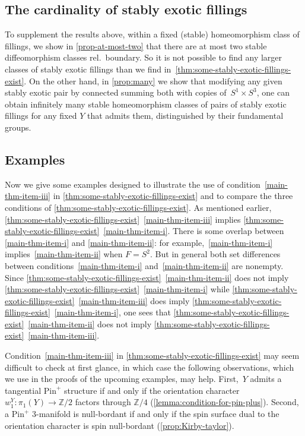 \documentclass[a4paper, reqno]{amsart}
\theoremstyle{definition}
\theoremstyle{remark}
\newcommand{\Z}{\mathbb{Z}}
\newcommand{\pinplus}{{\mathrm{Pin}^+}\!}
\begin{document}
\subsection*{The cardinality of stably exotic fillings} To supplement the results above, within a fixed (stable) homeomorphism class of fillings, we show in \cref{prop-at-most-two} that  there are at most two stable diffeomorphism classes rel.\ boundary. So it is not possible to find any larger classes of stably exotic fillings than we find in~\cref{thm:some-stably-exotic-fillings-exist}. 
On the other hand, in \cref{prop:many} we show that modifying any given stably exotic pair by connected summing both with copies of~$S^1 \times S^3$, one can obtain infinitely many stable homeomorphism classes of pairs of stably exotic fillings for any fixed $Y$ that admits them, distinguished  by their fundamental groups. 

\subsection*{Examples}

Now we give some examples designed to illustrate the use of condition~\eqref{main-thm-item-iii} in \cref{thm:some-stably-exotic-fillings-exist} and to compare the three conditions of \cref{thm:some-stably-exotic-fillings-exist}. As mentioned earlier, \cref{thm:some-stably-exotic-fillings-exist}~\eqref{main-thm-item-iii} implies \cref{thm:some-stably-exotic-fillings-exist}~\eqref{main-thm-item-i}. 
There is some overlap between \eqref{main-thm-item-i} and \eqref{main-thm-item-ii}: for example,~\eqref{main-thm-item-i} implies~\eqref{main-thm-item-ii} when $F=S^2$. But in general both set differences between conditions~\eqref{main-thm-item-i} and~\eqref{main-thm-item-ii} are nonempty. 
Since \cref{thm:some-stably-exotic-fillings-exist}~\eqref{main-thm-item-ii} does not imply \cref{thm:some-stably-exotic-fillings-exist}~\eqref{main-thm-item-i} while \cref{thm:some-stably-exotic-fillings-exist}~\eqref{main-thm-item-iii} does imply \cref{thm:some-stably-exotic-fillings-exist}~\eqref{main-thm-item-i}, one sees that \cref{thm:some-stably-exotic-fillings-exist}~\eqref{main-thm-item-ii} does not imply \cref{thm:some-stably-exotic-fillings-exist}~\eqref{main-thm-item-iii}.

\medskip

Condition~\eqref{main-thm-item-iii} in \cref{thm:some-stably-exotic-fillings-exist} may seem difficult to check at first glance, in which case the following observations, which we use in the proofs of the upcoming examples, may help. First,~$Y$ admits a tangential $\pinplus$ structure if and only if the orientation character $w_1^Y\colon \pi_1(Y)\to\Z/2$ factors through $\Z/4$ (\cref{lemma:condition-for-pin-plus}). Second, a $\pinplus$ 3-manifold is null-bordant if and only if the spin surface dual to the orientation character is spin null-bordant (\cref{prop:Kirby-taylor}).
\end{document}
